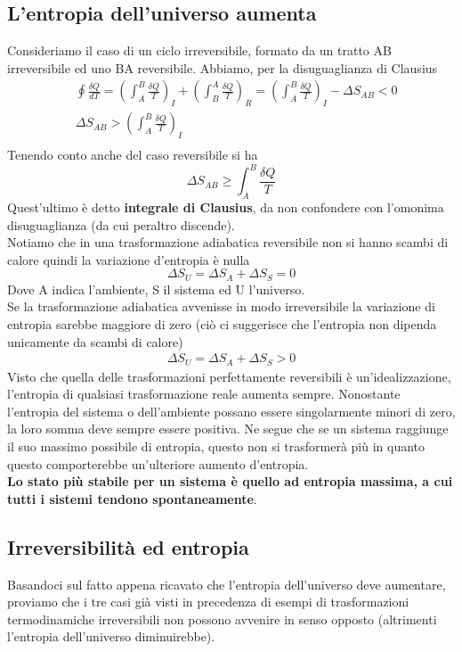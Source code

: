 \documentclass[
10pt, %
a4paper, %
oneside, %
headinclude,footinclude, %
BCOR5mm, %
]{scrartcl}
\begin{document}
\subsection{L'entropia dell'universo aumenta}
Consideriamo il caso di un ciclo irreversibile, formato da un tratto AB irreversibile ed uno BA reversibile. Abbiamo, per la disuguaglianza di Clausius
\begin{align*}
	&\oint \frac{\delta Q}{dT}=\left( \int_A^B  \frac{\delta Q}{T}\right)_I + \left(\int_B^A \frac{\delta Q}{T}\right)_R =\left(\int_A^B \frac{\delta Q}{T}\right)_I  - \Delta S_{AB} < 0\\
	&\Delta S_{AB} > \left(\int_A^B \frac{\delta Q}{T}\right)_I \\
\end{align*}Tenendo conto anche del caso reversibile si ha
\[\Delta S_{AB} \geq \int_A^B \frac{\delta Q}{T}\]
Quest'ultimo è detto \textbf{integrale di Clausius}, da non confondere con l'omonima disuguaglianza (da cui peraltro discende).\\
Notiamo che in una trasformazione adiabatica reversibile non si hanno scambi di calore quindi la variazione d'entropia è nulla
\[\Delta S_U = \Delta S_A + \Delta S_S = 0\]
Dove A indica l'ambiente, S il sistema ed U l'universo.\\
Se la trasformazione adiabatica avvenisse in modo irreversibile la variazione di entropia sarebbe maggiore di zero (ciò ci suggerisce che l'entropia non dipenda unicamente da scambi di calore)
\begin{align*}
	\Delta S_U = \Delta S_A + \Delta S_S > 0
\end{align*}
Visto che quella delle trasformazioni perfettamente reversibili è un'idealizzazione, l'entropia di qualsiasi trasformazione reale aumenta sempre. Nonostante l'entropia del sistema o dell'ambiente possano essere singolarmente minori di zero, la loro somma deve sempre essere positiva. Ne segue che se un sistema raggiunge il suo massimo possibile di entropia, questo non si trasformerà più in quanto questo comporterebbe un'ulteriore aumento d'entropia.\\
\textbf{Lo stato più stabile per un sistema è quello ad entropia massima, a cui tutti i sistemi tendono spontaneamente}.
\subsection{Irreversibilità ed entropia}
Basandoci sul fatto appena ricavato che l'entropia dell'universo deve aumentare, proviamo che i tre casi già visti in precedenza di esempi di trasformazioni termodinamiche irreversibili non possono avvenire in senso opposto (altrimenti l'entropia dell'universo diminuirebbe). 
\end{document}
